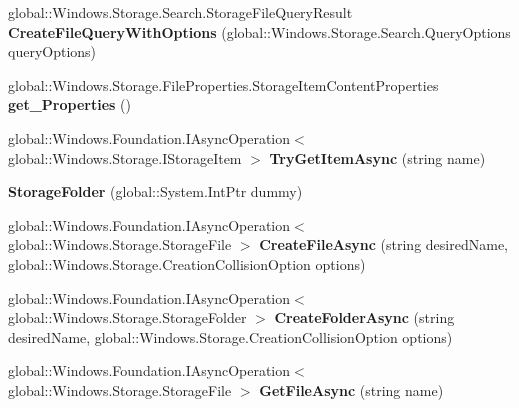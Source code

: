 \begin{DoxyCompactItemize}
\mbox{\label{class_windows_1_1_storage_1_1_storage_folder_a61bb687dd56eb8dc8b62c6d031f10c42}} 
global\+::\+Windows.\+Storage.\+Search.\+Storage\+File\+Query\+Result {\bfseries Create\+File\+Query\+With\+Options} (global\+::\+Windows.\+Storage.\+Search.\+Query\+Options query\+Options)
\item 
\mbox{\label{class_windows_1_1_storage_1_1_storage_folder_a00d4c92d7a7b2590b3bee76b0de81d34}} 
global\+::\+Windows.\+Storage.\+File\+Properties.\+Storage\+Item\+Content\+Properties {\bfseries get\+\_\+\+Properties} ()
\item 
\mbox{\label{class_windows_1_1_storage_1_1_storage_folder_a1fb213152c9afc34cd979395c35450f9}} 
global\+::\+Windows.\+Foundation.\+I\+Async\+Operation$<$ global\+::\+Windows.\+Storage.\+I\+Storage\+Item $>$ {\bfseries Try\+Get\+Item\+Async} (string name)
\item 
\mbox{\label{class_windows_1_1_storage_1_1_storage_folder_a3088d0d3f00525cc36b786ec7b321398}} 
{\bfseries Storage\+Folder} (global\+::\+System.\+Int\+Ptr dummy)
\item 
\mbox{\label{class_windows_1_1_storage_1_1_storage_folder_a1148f0c45b571856ab96a2bf97e2dd87}} 
global\+::\+Windows.\+Foundation.\+I\+Async\+Operation$<$ global\+::\+Windows.\+Storage.\+Storage\+File $>$ {\bfseries Create\+File\+Async} (string desired\+Name, global\+::\+Windows.\+Storage.\+Creation\+Collision\+Option options)
\item 
\mbox{\label{class_windows_1_1_storage_1_1_storage_folder_ad7abc9e33097dc2a8e60d66d76e5558c}} 
global\+::\+Windows.\+Foundation.\+I\+Async\+Operation$<$ global\+::\+Windows.\+Storage.\+Storage\+Folder $>$ {\bfseries Create\+Folder\+Async} (string desired\+Name, global\+::\+Windows.\+Storage.\+Creation\+Collision\+Option options)
\item 
\mbox{\label{class_windows_1_1_storage_1_1_storage_folder_a3766a445bb3e86f2bf570d83084bb729}} 
global\+::\+Windows.\+Foundation.\+I\+Async\+Operation$<$ global\+::\+Windows.\+Storage.\+Storage\+File $>$ {\bfseries Get\+File\+Async} (string name)

\end{DoxyCompactItemize}
